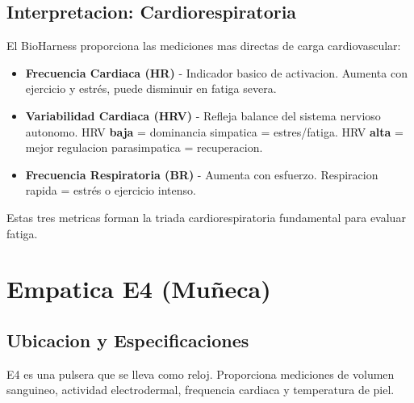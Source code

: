 \subsection{Interpretacion: Cardiorespiratoria}

El BioHarness proporciona las mediciones mas directas de carga cardiovascular:

\begin{itemize}
    \item \textbf{Frecuencia Cardiaca (HR)} - Indicador basico de activacion. Aumenta con
          ejercicio y estrés, puede disminuir en fatiga severa.

    \item \textbf{Variabilidad Cardiaca (HRV)} - Refleja balance del sistema nervioso autonomo.
          HRV  \textbf{baja} = dominancia simpatica = estres/fatiga. HRV \textbf{alta} = mejor
          regulacion parasimpatica = recuperacion.

    \item \textbf{Frecuencia Respiratoria (BR)} - Aumenta con esfuerzo. Respiracion
          rapida = estrés o ejercicio intenso.
\end{itemize}

Estas tres metricas forman la triada cardiorespiratoria fundamental para evaluar fatiga.

\section{Empatica E4 (Muñeca)}

\subsection{Ubicacion y Especificaciones}

E4 es una pulsera que se lleva como reloj. Proporciona mediciones de volumen
sanguineo, actividad electrodermal, frequencia cardiaca y temperatura de piel.

